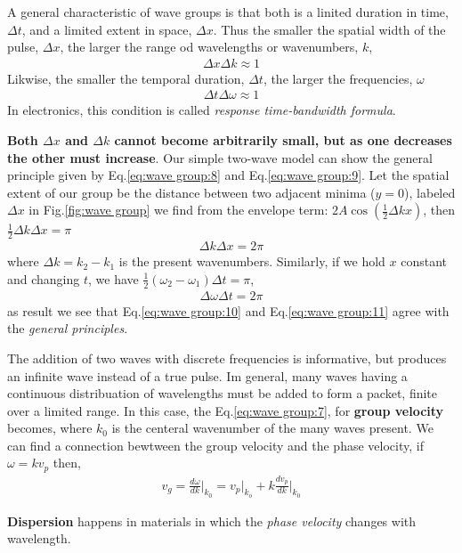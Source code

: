         \bulletpar A general characteristic of wave groups is that both is a linited duration in time, $\Delta{t}$, and a limited extent in space, $\Delta{x}$.
        Thus the smaller the spatial width of the pulse, $\Delta{x}$, the larger the range od wavelengths or wavenumbers, $k$,
        \begin{align}
            \label{eq:wave group:8}
            \Delta{x} \Delta{k} \approx 1
        \end{align}
        Likwise, the smaller the temporal duration, $\Delta{t}$, the larger the frequencies, $\omega$
        \begin{align}
            \label{eq:wave group:9}
            \Delta{t} \Delta{\omega} \approx 1
        \end{align}
        In electronics, this condition is called \textit{response time-bandwidth formula}.

        \starpar \textbf{Both $\Delta{x}$ and $\Delta{k}$ cannot become arbitrarily small, but as one decreases the other must increase}. Our simple two-wave 
        model can show the general principle given by Eq.\eqref{eq:wave group:8} and Eq.\eqref{eq:wave group:9}. Let the spatial extent of our group be the 
        distance between two adjacent minima ($y=0$), labeled $\Delta{x}$ in Fig.\eqref{fig:wave group} we find from the envelope term: 
        $2A \cos{(\frac{1}{2}\Delta{kx})}$, then $\frac{1}{2} \Delta{k} \Delta{x}=\pi$
        \begin{align}
            \label{eq:wave group:10}
            \Delta{k} \Delta{x} = 2 \pi
        \end{align}
        where $\Delta{k} = k_2 - k_1$ is the present wavenumbers. Similarly, if we hold $x$ constant and changing $t$, we have 
        $\frac{1}{2}(\omega_2-\omega_1)\Delta{t} = \pi$, 
        \begin{align}
            \label{eq:wave group:11}
            \Delta{\omega} \Delta{t} = 2 \pi
        \end{align}
        as result we see that Eq.\eqref{eq:wave group:10} and Eq.\eqref{eq:wave group:11} agree with the \textit{general principles}. 

        \bulletpar The addition of two waves with discrete frequencies is informative, but produces an infinite wave instead of a true pulse. Im general, many waves 
        having a continuous distribuation of wavelengths must be added to form a packet, finite over a limited range. In this case, the Eq.\eqref{eq:wave group:7},
        for \textbf{group velocity} becomes, 
        where $k_0$ is the centeral wavenumber of the many waves present. We can find a connection bewtween the group velocity and the phase velocity, if 
        $\omega = k v_p$ then,
        \begin{align}
            \label{eq:group and phase velovity}
            v_g = \frac{d\omega}{dk} \Big|_{k_0} = v_p \Big|_{k_o} + k \frac{dv_p}{dk} \Big|_{k_0}
        \end{align}

        \bulletpar \textbf{Dispersion} happens in materials in which the \textit{phase velocity} changes with wavelength.



